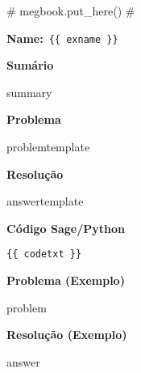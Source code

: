 {# megbook.put_here() #}

\textbf{Name:}~\verb+{{ exname }}+

\noindent\textbf{Sumário} 

{{ summary }}

\noindent\textbf{Problema} 

{{ problemtemplate }}

\noindent\textbf{Resolução}

{{ answertemplate }}

\noindent\textbf{Código Sage/Python}

\begin{verbatim}
{{ codetxt }}
\end{verbatim}

\noindent\textbf{Problema (Exemplo)}

{{ problem }}

\noindent\textbf{Resolução (Exemplo)}

{{ answer }}




